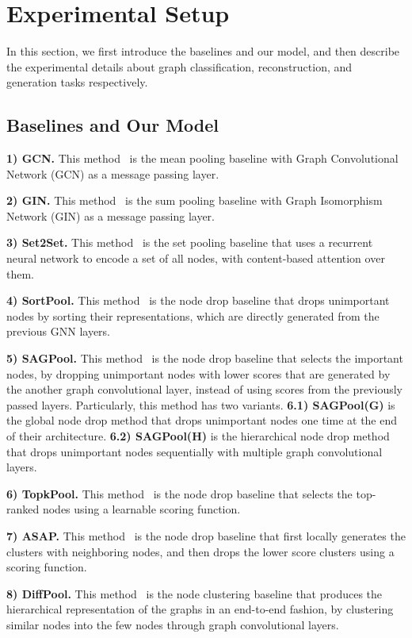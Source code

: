 \section{Experimental Setup}
In this section, we first introduce the baselines and our model, and then describe the experimental details about graph classification, reconstruction, and generation tasks respectively.


\subsection{Baselines and Our Model \label{appendix/classification/model}}
\textbf{1) GCN.} This method~\citep{GCN} is the mean pooling baseline with Graph Convolutional Network (GCN) as a message passing layer.

\textbf{2) GIN.} This method~\citep{GIN} is the sum pooling baseline with Graph Isomorphism Network (GIN) as a message passing layer.

\textbf{3) Set2Set.} This method~\citep{Set2Set} is the set pooling baseline that uses a recurrent neural network to encode a set of all nodes, with content-based attention over them.

\textbf{4) SortPool.} This method~\citep{SortPool} is the node drop baseline that drops unimportant nodes by sorting their representations, which are directly generated from the previous GNN layers.

\textbf{5) SAGPool.} This method~\citep{SAGPool} is the node drop baseline that selects the important nodes, by dropping unimportant nodes with lower scores that are generated by the another graph convolutional layer, instead of using scores from the previously passed layers. Particularly, this method has two variants. \textbf{6.1) SAGPool(G)} is the global node drop method that drops unimportant nodes one time at the end of their architecture. \textbf{6.2) SAGPool(H)} is the hierarchical node drop method that drops unimportant nodes sequentially with multiple graph convolutional layers.  

\textbf{6) TopkPool.} This method~\citep{TopKPool} is the node drop baseline that selects the top-ranked nodes using a learnable scoring function.

\textbf{7) ASAP.} This method~\citep{ASAP} is the node drop baseline that first locally generates the clusters with neighboring nodes, and then drops the lower score clusters using a scoring function.

\textbf{8) DiffPool.} This method~\citep{DiffPool} is the node clustering baseline that produces the hierarchical representation of the graphs in an end-to-end fashion, by clustering similar nodes into the few nodes through graph convolutional layers. 

